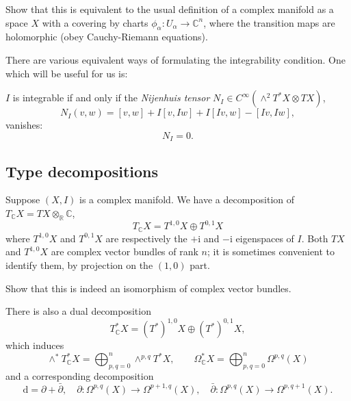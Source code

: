 \documentclass[12pt,letterpaper,reqno]{amsart}
\numberwithin{equation}{section}
\newcommand{\R}{\ensuremath{\mathbb R}}
\newcommand{\C}{\ensuremath{\mathbb C}}
\newcommand{\I}{{\mathrm i}}
\newcommand{\de}{\mathrm{d}}
\newcommand{\ti}[1]{\textit{#1}}
\begin{document}
\begin{exercise} Show that this is equivalent to the usual definition of a complex manifold as a space
$X$ with a covering by charts $\phi_\alpha: U_\alpha \to \C^n$, where the transition maps are holomorphic (obey Cauchy-Riemann equations).
\end{exercise}

There are various equivalent ways of formulating the integrability condition. One which will be useful for us is:
\begin{prop} $I$ is integrable if and only if the \ti{Nijenhuis tensor} $N_I \in C^\infty(\wedge^2 T^*X \otimes TX)$,
\begin{equation}
N_I(v,w) = [v,w] + I[v,Iw] + I[Iv,w] - [Iv,Iw],
\end{equation}
vanishes:
\begin{equation}
N_I = 0.  
\end{equation}
\end{prop}

\subsection{Type decompositions}
Suppose $(X,I)$ is a complex manifold.
We have a decomposition
of $T_\C X = TX \otimes_\R \C$,
\begin{equation}
T_\C X = T^{1,0} X \oplus T^{0,1} X
  \end{equation}
where $T^{1,0} X$ and $T^{0,1} X$ are 
respectively the
$+\I$ and $-\I$ eigenspaces of $I$.
Both $TX$ and $T^{1,0}X$ are complex vector bundles 
of rank $n$; it is sometimes convenient to identify
them, by projection on the $(1,0)$ part.

\begin{exercise}
Show that this is indeed an isomorphism 
of complex vector bundles.
\end{exercise}

There is also a dual decomposition
\begin{equation}
T^*_\C X = (T^*)^{1,0} X \oplus (T^*)^{0,1} X,
  \end{equation}
which induces
\begin{equation}
\wedge^* T^*_\C X = \bigoplus_{p,q=0}^n \wedge^{p,q} T^* X , \qquad \Omega^*_\C X = \bigoplus_{p,q=0}^n \Omega^{p,q}(X)
\end{equation}
and a corresponding decomposition
\begin{equation}
\de = \partial + \bar\partial, \quad \partial: \Omega^{p,q}(X) \to \Omega^{p+1,q}(X), \quad \bar\partial: \Omega^{p,q}(X) \to \Omega^{p,q+1}(X).
\end{equation}
\end{document}

